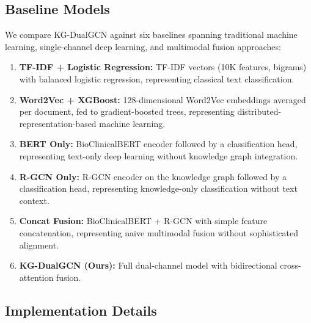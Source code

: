 \documentclass[11pt,onecolumn,a4paper]{article}
\begin{document}
\subsection{Baseline Models}

We compare KG-DualGCN against six baselines spanning traditional machine learning, single-channel deep learning, and multimodal fusion approaches:

\begin{enumerate}[leftmargin=*]
    \item \textbf{TF-IDF + Logistic Regression:} TF-IDF vectors (10K features, bigrams) with balanced logistic regression, representing classical text classification.
    \item \textbf{Word2Vec + XGBoost:} 128-dimensional Word2Vec embeddings averaged per document, fed to gradient-boosted trees, representing distributed-representation-based machine learning.
    \item \textbf{BERT Only:} BioClinicalBERT encoder followed by a classification head, representing text-only deep learning without knowledge graph integration.
    \item \textbf{R-GCN Only:} R-GCN encoder on the knowledge graph followed by a classification head, representing knowledge-only classification without text context.
    \item \textbf{Concat Fusion:} BioClinicalBERT + R-GCN with simple feature concatenation, representing naive multimodal fusion without sophisticated alignment.
    \item \textbf{KG-DualGCN (Ours):} Full dual-channel model with bidirectional cross-attention fusion.
\end{enumerate}

\subsection{Implementation Details}
\end{document}
